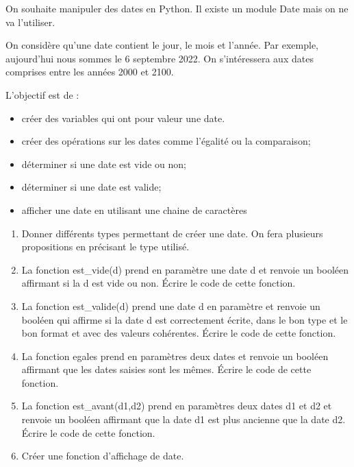 \documentclass[11pt,a4paper]{article}
\newcounter{num}
\begin{document}
On souhaite manipuler des dates en Python. Il existe un module Date mais on ne va l'utiliser.

On considère qu'une date contient le jour, le mois et l'année. Par exemple, aujourd'hui nous sommes le 6 septembre 2022. On s'intéressera aux dates comprises entre les années 2000 et 2100.

L'objectif est de :
\begin{itemize}
\item créer des variables qui ont pour valeur une date.
\item créer des opérations sur les dates comme l'égalité ou la comparaison;
\item déterminer si une date est vide ou non;
\item déterminer si une date est valide;
\item afficher une date en utilisant une chaine de caractères
\end{itemize}


\begin{enumerate}
\item Donner différents types permettant de créer une date. On fera plusieurs propositions en précisant le type utilisé.

\item La fonction \textsf{est\_vide(d)} prend en paramètre une date \textsf{d} et renvoie un booléen affirmant si la d est vide ou non.
Écrire le code de cette fonction.

\item La fonction \textsf{est\_valide(d)} prend une date \textsf{d} en paramètre et renvoie un booléen qui affirme si la date \textsf{d} est correctement écrite, dans le bon type et le bon format et avec des valeurs cohérentes.
Écrire le code de cette fonction.

\item La fonction \textsf{egales} prend en paramètres deux dates et renvoie un booléen affirmant que les dates saisies sont les mêmes.
Écrire le code de cette fonction.

\item La fonction \textsf{est\_avant(d1,d2)} prend en paramètres deux dates \textsf{d1} et \textsf{d2} et renvoie un booléen affirmant que la date \textsf{d1} est plus ancienne que la date \textsf{d2}.
Écrire le code de cette fonction.

\item Créer une fonction d'affichage de date.
\end{enumerate}
\end{document}
